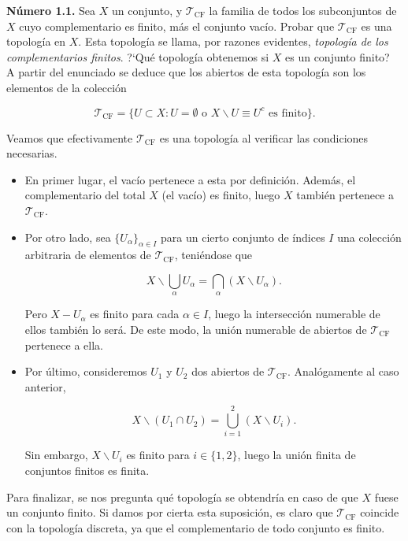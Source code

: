
\textbf{Número 1.1.} Sea $X$ un conjunto, y $\mathcal{T}_{\text{CF}}$ la familia de todos los subconjuntos de $X$ cuyo complementario es finito, más el conjunto vacío. Probar que $\mathcal{T}_{\text{CF}}$ es una topología en $X$. Esta topología se llama, por razones evidentes, \textit{topología de los complementarios finitos}. ?`Qué topología obtenemos si $X$ es un conjunto finito?  \\

A partir del enunciado se deduce que los abiertos de esta topología son los elementos de la colección 

\[\mathcal{T}_{\text{CF}}= \{U \subset X : U= \emptyset \text{ o } X \backslash U\equiv U^c \text{ es finito}\}.\]

Veamos que efectivamente $\mathcal{T}_{\text{CF}}$ es una topología al verificar las condiciones necesarias. 

\begin{itemize}
\item En primer lugar, el vacío pertenece a esta por definición. Además, el complementario del total $X$ (el vacío) es finito, luego $X$ también pertenece a $\mathcal{T}_{\text{CF}}$. 

\item Por otro lado, sea $\{U_\alpha\}_{\alpha \in I}$ para un cierto conjunto de índices $I$ una colección arbitraria de elementos de $\mathcal{T}_{\text{CF}}$, teniéndose que 

\[X \backslash \bigcup_{\alpha}U_\alpha = \bigcap_{\alpha} (X\backslash U_\alpha).\]

Pero $X-U_\alpha$ es finito para cada $\alpha \in I$, luego la intersección numerable de ellos también lo será. De este modo, la unión numerable de abiertos de $\mathcal{T}_{\text{CF}}$ pertenece a ella.

\item Por último, consideremos $U_1$ y $U_2$ dos abiertos de $\mathcal{T}_{\text{CF}}$. Analógamente al caso anterior, 

\[X \backslash (U_1 \cap U_2) = \bigcup_{i=1}^2 (X\backslash U_i).\]

Sin embargo, $X \backslash U_i$ es finito para $i\in\{1,2\}$, luego la unión finita de conjuntos finitos es finita.
\end{itemize}

Para finalizar, se nos pregunta qué topología se obtendría en caso de que $X$ fuese un conjunto finito. Si damos por cierta esta suposición, es claro que $\mathcal{T}_{\text{CF}}$ coincide con la topología discreta, ya que el complementario de todo conjunto es finito. \\


